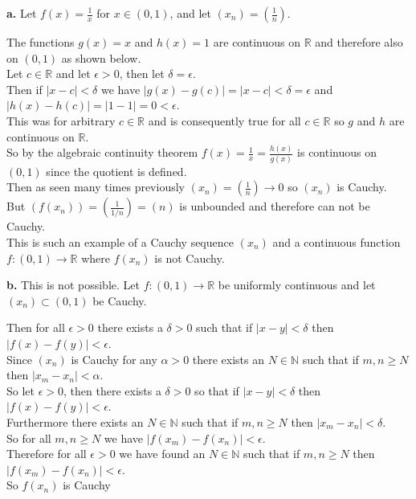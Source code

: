 \documentclass{article}
\begin{document}
{\Large\textbf{a.}} Let $f(x) =\frac{1}{x}$ for $x\in (0, 1)$, and let $(x_n) = (\frac{1}{n})$.
\begin{center}
    \doublespacing
    The functions $g(x) = x$ and $h(x) = 1$ are continuous on $\mathbb{R}$ and therefore also on $(0, 1)$ as shown below.
    \\Let $c\in\mathbb{R}$ and let $\epsilon > 0$, then let $\delta =\epsilon$.
    \\Then if $|x - c| <\delta$ we have $|g(x) - g(c)| = |x - c| <\delta =\epsilon$ and $|h(x) - h(c)| = |1 - 1| = 0 <\epsilon$.
    \\This was for arbitrary $c\in\mathbb{R}$ and is consequently true for all $c\in\mathbb{R}$ so $g$ and $h$ are continuous on $\mathbb{R}$.
    \\So by the algebraic continuity theorem $f(x) =\frac{1}{x} =\frac{h(x)}{g(x)}$ is continuous on $(0, 1)$ since the quotient is defined.
    \\Then as seen many times previously $(x_n) = (\frac{1}{n})\rightarrow 0$ so $(x_n)$ is Cauchy.
    \\But $(f(x_n)) = (\frac{1}{1/n}) = (n)$ is unbounded and therefore can not be Cauchy.
    \\This is such an example of a Cauchy sequence $(x_n)$ and a continuous function $f: (0, 1)\rightarrow\mathbb{R}$ where $f(x_n)$ is not Cauchy.
\end{center}

{\Large\textbf{b.}} This is not possible. Let $f: (0, 1)\rightarrow\mathbb{R}$ be uniformly continuous and let $(x_n)\subset (0, 1)$ be Cauchy.
\begin{center}
    \doublespacing
    Then for all $\epsilon > 0$ there exists a $\delta > 0$ such that if $|x - y| <\delta$ then $|f(x) - f(y)| <\epsilon$.
    \\Since $(x_n)$ is Cauchy for any $\alpha > 0$ there exists an $N\in\mathbb{N}$ such that if $m, n\geq N$ then $|x_m - x_n| <\alpha$.
    \\So let $\epsilon > 0$, then there exists a $\delta > 0$ so that if $|x - y| <\delta$ then $|f(x) - f(y)| <\epsilon$.
    \\Furthermore there exists an $N\in\mathbb{N}$ such that if $m, n\geq N$ then $|x_m - x_n| <\delta$.
    \\So for all $m, n\geq N$ we have $|f(x_m) - f(x_n)| <\epsilon$.
    \\Therefore for all $\epsilon > 0$ we have found an $N\in\mathbb{N}$ such that if $m, n\geq N$ then $|f(x_m) - f(x_n)| <\epsilon$.
    \\So $f(x_n)$ is Cauchy \qedsymbol
\end{center}
\end{document}
